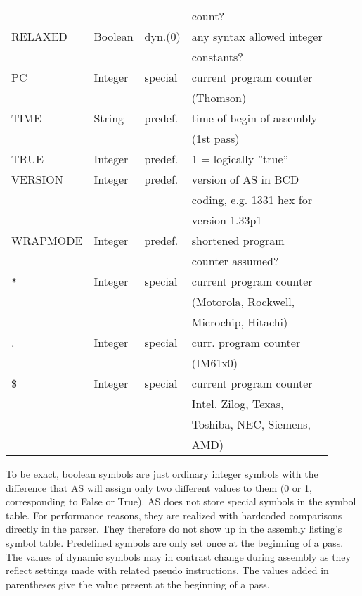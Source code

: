 \documentclass[12pt,twoside]{report}
\begin{document}
\begin{center}
\begin{longtable}{|l|l|l|l|}
              &           &            & count? \\
RELAXED       & Boolean   & dyn.(0)    & any syntax allowed integer \\
              &           &            & constants? \\
PC            & Integer   & special    & current program counter \\
              &           &            & (Thomson) \\
TIME          & String    & predef.    & time of begin of assembly \\
              &           &            & (1st pass) \\
TRUE          & Integer   & predef.    & 1 = logically ''true'' \\
VERSION       & Integer   & predef.    & version of AS in BCD \\
	      &  	  &	       & coding, e.g. 1331 hex for \\
              &           &            & version 1.33p1 \\
WRAPMODE      & Integer   & predef.    & shortened program \\
              &           &            & counter assumed? \\
\verb!*!      & Integer   & special    & current program counter \\
              &           &            & (Motorola, Rockwell, \\
              &           &            & Microchip, Hitachi) \\
.             & Integer   & special    & curr. program counter \\
              &           &            & (IM61x0) \\
\$            & Integer   & special    & current program counter \\
              &           &            & Intel, Zilog, Texas, \\
              &           &            & Toshiba, NEC, Siemens, \\
              &           &            & AMD) \\
\hline
\end{longtable}\end{center}

To be exact, boolean symbols are just ordinary integer symbols with the
difference that AS will assign only two different values to them (0 or 1,
corresponding to False or True).  AS does not store special symbols
in the symbol table.  For performance reasons, they are realized with
hardcoded comparisons directly in the parser.  They therefore do not
show up in the assembly listing's symbol table.  Predefined symbols
are only set once at the beginning of a pass.  The values of dynamic
symbols may in contrast change during assembly as they reflect
settings made with related pseudo instructions.  The values added in
parentheses give the value present at the beginning of a pass.
\end{document}
